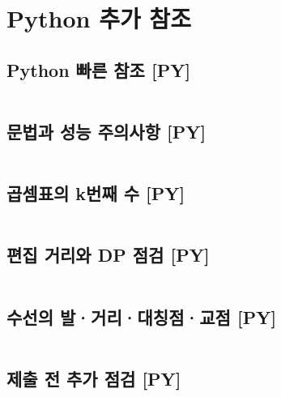 \documentclass[landscape,8pt,a4paper,twocolumn]{extarticle}
\begin{document}
\section{Python 추가 참조}
\subsection{Python 빠른 참조 [PY]}
\inputminted{python}{supplement/QuickReference.py}
\subsection{문법과 성능 주의사항 [PY]}
\inputminted{python}{supplement/Pitfalls.txt}
\subsection{곱셈표의 k번째 수 [PY]}
\inputminted{python}{supplement/MultiplicationTable.py}
\subsection{편집 거리와 DP 점검 [PY]}
\inputminted{python}{supplement/EditDistance.py}
\subsection{수선의 발·거리·대칭점·교점 [PY]}
\inputminted{python}{supplement/GeometryExtra.py}
\subsection{제출 전 추가 점검 [PY]}
\inputminted{python}{supplement/Checklist.txt}
\end{document}
